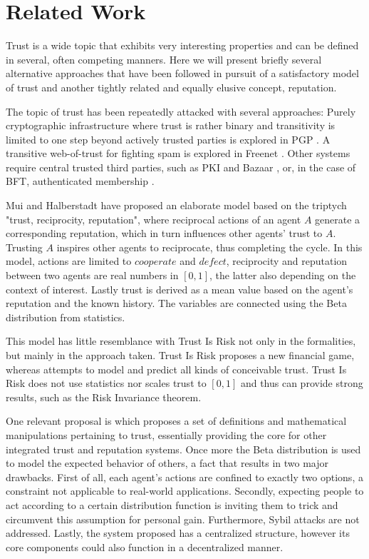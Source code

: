 \section{Related Work}
  Trust is a wide topic that exhibits very interesting properties and can be defined in several, often competing manners.
  Here we will present briefly several alternative approaches that have been followed in pursuit of a satisfactory model of
  trust and another tightly related and equally elusive concept, reputation.

  The topic of trust has been repeatedly attacked with several approaches: Purely cryptographic infrastructure where trust is
  rather binary and transitivity is limited to one step beyond actively trusted parties is explored in PGP \cite{pgp}. A
  transitive web-of-trust for fighting spam is explored in Freenet \cite{freenet}. Other systems require central trusted
  third parties, such as PKI \cite{pki} and Bazaar \cite{bazaar}, or, in the case of BFT, authenticated membership
  \cite{byzantine}.

  Mui and Halberstadt \cite{mui} have proposed an elaborate model based on the triptych "trust, reciprocity, reputation",
  where reciprocal actions of an agent $A$ generate a corresponding reputation, which in turn influences other agents' trust
  to $A$. Trusting $A$ inspires other agents to reciprocate, thus completing the cycle. In this model, actions are limited to
  $cooperate$ and $defect$, reciprocity and reputation between two agents are real numbers in $\left[0, 1\right]$, the latter
  also depending on the context of interest. Lastly trust is derived as a mean value based on the agent's reputation and the
  known history. The variables are connected using the Beta distribution from statistics.

  This model has little resemblance with Trust Is Risk not only in the formalities, but mainly in the approach taken. Trust
  Is Risk proposes a new financial game, whereas \cite{mui} attempts to model and predict all kinds of conceivable trust.
  Trust Is Risk does not use statistics nor scales trust to $\left[0, 1\right]$ and thus can provide strong results, such as
  the Risk Invariance theorem.

  One relevant proposal is \cite{beta} which proposes a set of definitions and mathematical manipulations pertaining to
  trust, essentially providing the core for other integrated trust and reputation systems. Once more the Beta distribution is
  used to model the expected behavior of others, a fact that results in two major drawbacks. First of all, each agent's
  actions are confined to exactly two options, a constraint not applicable to real-world applications. Secondly, expecting
  people to act according to a certain distribution function is inviting them to trick and circumvent this assumption for
  personal gain. Furthermore, Sybil attacks are not addressed. Lastly, the system proposed has a centralized structure,
  however its core components could also function in a decentralized manner.

